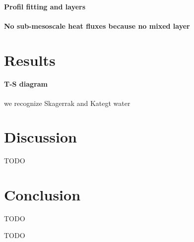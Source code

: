 \documentclass[12pt,a4paper]{article}
\begin{document}
\paragraph{Profil fitting and layers}
\paragraph{No sub-mesoscale heat fluxes because no mixed layer}

\section{Results}

\paragraph{T-S diagram}
we recognize Skagerrak and Kategt water \citep{bjork2003}

\section{Discussion}

TODO

\section{Conclusion}

TODO
\newpage




\newpage

\appendix
\setcounter{figure}{0}

TODO
\end{document}
